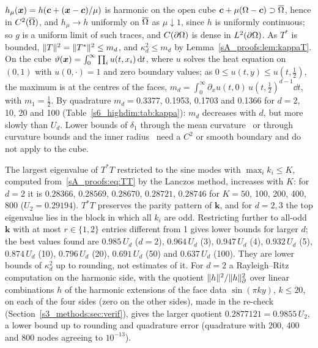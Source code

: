 \begin{remark}
$h_\mu(\boldsymbol{x})=h(\boldsymbol c+(\boldsymbol{x}-\boldsymbol c)/\mu)$ is harmonic on the open cube
$\boldsymbol c+\mu(\Omega-\boldsymbol c)\supset\overline{\Omega}$, hence in $C^2(\overline{\Omega})$, and
$h_\mu\to h$ uniformly on $\overline{\Omega}$ as $\mu\downarrow1$, since $h$ is uniformly continuous; so
$g$ is a uniform limit of such traces, and $C(\partial\Omega)$ is dense in $L^2(\partial\Omega)$. As $T^*$ is
bounded, $\lVert T\rVert^2=\lVert T^*\rVert^2\le m_d$, and $\kappa_d^2\le m_d$ by
Lemma~\ref{sA_proofs:lem:kappaT}. On
the cube $\vartheta(\boldsymbol{x})=\int_0^\infty\prod_iu(t,x_i)\,\mathrm{d} t$, where $u$ solves the heat equation on
$(0,1)$ with $u(0,\cdot)=1$ and zero boundary values; as $0\le u(t,y)\le u(t,\frac12)$, the maximum
is at the centres of the faces, $m_d=\int_0^\infty\partial_xu(t,0)\,u(t,\frac12)^{d-1}\dd t$, with
$m_1=\frac12$. By quadrature $m_d=0.3377$, 0.1953, 0.1703 and 0.1366 for $d=2$, 10, 20 and 100
(Table~\ref{s6_highdim:tab:kappa}): $m_d$ decreases with $d$, but more slowly than $U_d$.
Lower bounds of $\delta_1$ through the mean
curvature~\citep{payne1970some,ferrero2005fourth} or through curvature bounds and the inner
radius~\citep{raulot2015sharp} need a $C^2$ or smooth boundary and do not apply to the cube.
\end{remark}

\begin{observation}\label{sA_proofs:obs:RR}
The largest eigenvalue of $T^*T$ restricted to the sine modes with $\max_ik_i\le K$, computed
from~\eqref{sA_proofs:eq:TT} by the Lanczos method, increases with $K$: for $d=2$ it is
$0.28366$, $0.28569$, $0.28670$, $0.28721$, $0.28746$ for $K=50$, 100, 200, 400, 800
($U_2=0.29194$). $T^*T$ preserves the parity pattern of $\boldsymbol k$, and for $d=2,3$ the top
eigenvalue lies in the block in which all $k_i$ are odd. Restricting further to all-odd
$\boldsymbol k$ with at most $r\in\{1,2\}$ entries different from 1 gives lower bounds for larger
$d$; the best values found are $0.985\,U_d$ ($d=2$), $0.964\,U_d$ (3), $0.947\,U_d$ (4),
$0.932\,U_d$ (5), $0.874\,U_d$ (10), $0.796\,U_d$ (20), $0.691\,U_d$ (50) and $0.637\,U_d$ (100).
They are lower bounds of $\kappa_d^2$ up to rounding, not estimates of it. For $d=2$ a
Rayleigh--Ritz computation on the harmonic side, with the quotient $\lVert h\rVert^2/\lVert h\rVert_{\partial}^2$ over linear
combinations $h$ of the harmonic extensions of the face data $\sin(\pi k y)$, $k\le20$, on each of
the four sides (zero on the other sides), made in the re-check (Section~\ref{s3_methods:sec:verif}),
gives the larger quotient $0.2877121=0.9855\,U_2$, a lower bound up to rounding and quadrature error
(quadrature with 200, 400 and 800 nodes agreeing to $10^{-13}$).
\end{observation}

